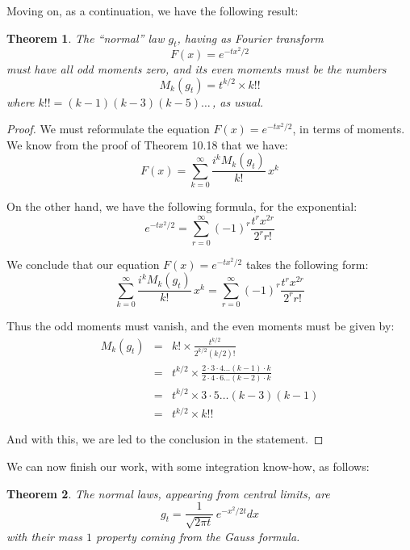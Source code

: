 \documentclass[12pt]{amsbook}
\newtheorem{theorem}{Theorem}[chapter]
\begin{document}
Moving on, as a continuation, we have the following result:

\begin{theorem}
The ``normal'' law $g_t$, having as Fourier transform 
$$F(x)=e^{-tx^2/2}$$
must have all odd moments zero, and its even moments must be the numbers
$$M_k(g_t)=t^{k/2}\times k!!$$
where $k!!=(k-1)(k-3)(k-5)\ldots\,$, as usual. 
\end{theorem}

\begin{proof}
We must reformulate the equation $F(x)=e^{-tx^2/2}$, in terms of moments. We know from the proof of Theorem 10.18 that we have:
$$F(x)=\sum_{k=0}^\infty\frac{i^kM_k(g_t)}{k!}\,x^k$$

On the other hand, we have the following formula, for the exponential:
$$e^{-tx^2/2}
=\sum_{r=0}^\infty
(-1)^r\frac{t^rx^{2r}}{2^rr!}$$

We conclude that our equation $F(x)=e^{-tx^2/2}$ takes the following form:
$$\sum_{k=0}^\infty\frac{i^kM_k(g_t)}{k!}\,x^k=\sum_{r=0}^\infty
(-1)^r\frac{t^rx^{2r}}{2^rr!}$$

Thus the odd moments must vanish, and the even moments must be given by:
\begin{eqnarray*}
M_k(g_t)
&=&k!\times\frac{t^{k/2}}{2^{k/2}(k/2)!}\\
&=&t^{k/2}\times\frac{2\cdot3\cdot4\ldots (k-1)\cdot k}{2\cdot 4\cdot 6\ldots (k-2)\cdot k}\\
&=&t^{k/2}\times 3\cdot 5\ldots(k-3)(k-1)\\
&=&t^{k/2}\times k!!
\end{eqnarray*}

And with this, we are led to the conclusion in the statement.
\end{proof}

We can now finish our work, with some integration know-how, as follows:


\begin{theorem}
The normal laws, appearing from central limits, are
$$g_t=\frac{1}{\sqrt{2\pi t}}\,e^{-x^2/2t}dx$$
with their mass $1$ property coming from the Gauss formula.
\end{theorem}
\end{document}
